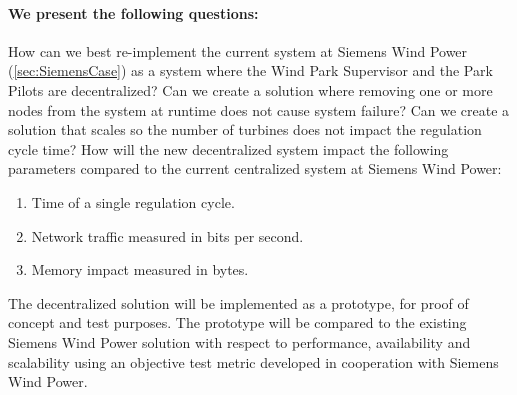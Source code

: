 \paragraph{We present the following questions:}
\begin{description} %
	 How can we best re-implement the current system at Siemens Wind Power (\cref{sec:SiemensCase}) as a system where the Wind Park Supervisor and the Park Pilots are decentralized?
	 Can we create a solution where removing one or more nodes from the system at runtime does not cause system failure?
	 Can we create a solution that scales so the number of turbines does not impact the regulation cycle time?
	 How will the new decentralized system impact the following parameters compared to the current centralized system at Siemens Wind Power:
	\begin{enumerate}
		\item Time of a single regulation cycle.
		\item Network traffic measured in bits per second.
		\item Memory impact measured in bytes.
	\end{enumerate}
\end{description}

The decentralized solution will be implemented as a prototype, for proof of concept and test purposes. The prototype will be compared to the existing Siemens Wind Power solution with respect to performance, availability and scalability using an objective test metric developed in cooperation with Siemens Wind Power.





